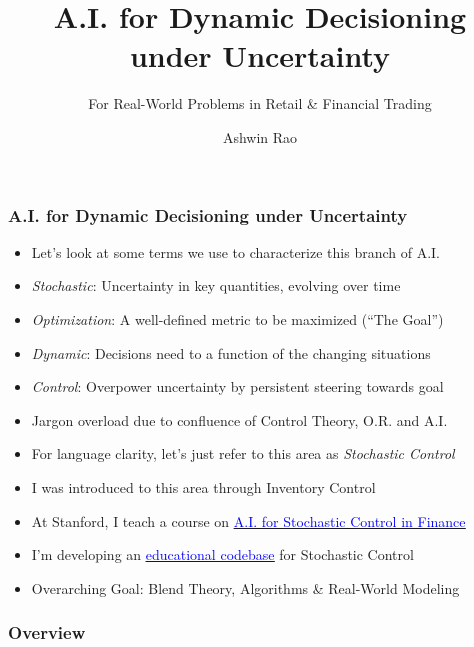 \documentclass[handout]{beamer}
\title[A.I For Retail/Finance]{A.I. for Dynamic Decisioning under Uncertainty} %
\subtitle{For Real-World Problems in Retail \& Financial Trading}
\author{Ashwin Rao} %
\institute[Target/Stanford] %
{VP Data Science at Target \& Adjunct Faculty at Stanford
}
\date{} %
\begin{document}
\begin{frame}
\titlepage %
\end{frame}

\begin{frame}
\frametitle{A.I. for Dynamic Decisioning under Uncertainty}
\pause
\begin{itemize}[<+->]
\item Let's look at some terms we use to characterize this branch of A.I.
\item {\em Stochastic}: Uncertainty in key quantities, evolving over time
\item {\em Optimization}: A well-defined metric to be maximized (``The Goal'')
\item {\em Dynamic}:  Decisions need to a function of the changing situations
\item {\em Control}: Overpower uncertainty by persistent steering towards goal
\item Jargon overload due to confluence of Control Theory, O.R. and A.I.
\item For language clarity, let's just refer to this area as {\em Stochastic Control}
\item I was introduced to this area through Inventory Control
\item At Stanford, I teach a course on \href{https://github.com/coverdrive/technical-documents/blob/master/finance/cme241/Stanford-CME241.pdf}{\underline{\textcolor{blue}{A.I. for Stochastic Control in Finance}}}
\item I'm developing an \href{https://github.com/coverdrive/MDP-DP-RL}{\underline{\textcolor{blue}{educational codebase}}} for Stochastic Control 
\item Overarching Goal: Blend Theory, Algorithms \& Real-World Modeling
\end{itemize}
\end{frame}


\begin{frame}
\frametitle{Overview} %
\tableofcontents %
\end{frame}
\end{document}
